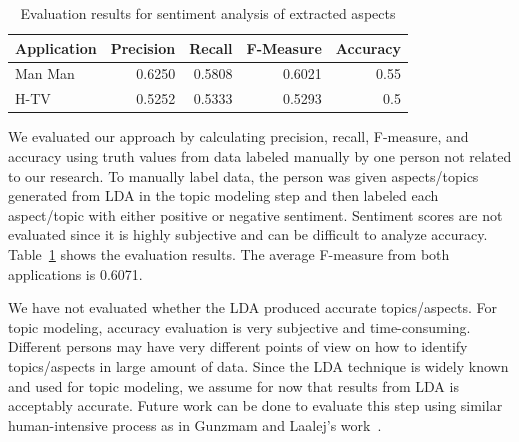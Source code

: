 \begin{table}[!htbp]
	\caption{Evaluation results for sentiment analysis of extracted aspects}
	\label{table:f-measureTopic}
	\centering
	\begin{tabular}{|l|r|r|r|r|}
		\hline
		\multicolumn{1}{|c|}{\textbf{Application}} & 
		\multicolumn{1}{|c|}{\textbf{Precision}} &
		\multicolumn{1}{|c|}{\textbf{Recall}} &
		\multicolumn{1}{|c|}{\textbf{F-Measure}} &
		\multicolumn{1}{|c|}{\textbf{Accuracy}} \\
		\hline
		Man Man & 
		0.6250
		& 
		0.5808
		& 
		0.6021
		& 
		0.55
		\\
		\hline
		H-TV & 0.5252 & 0.5333 & 0.5293 & 0.5\\
		\hline
	\end{tabular}
\end{table}


We evaluated our approach by calculating precision, recall, F-measure, and accuracy using truth values from data labeled manually by one person not related to our research. To manually label data, the person was given aspects/topics generated from LDA in the topic modeling step and then labeled each aspect/topic with either positive or negative sentiment. Sentiment scores are not evaluated since it is highly subjective and can be difficult to analyze accuracy. Table~\ref{table:f-measureTopic} shows the evaluation results. The average F-measure from both applications is 0.6071. 

We have not evaluated whether the LDA produced accurate topics/aspects. For topic modeling, accuracy evaluation is very subjective and time-consuming. Different persons may have very different points of view on how to identify topics/aspects in large amount of data.  Since the LDA technique is widely known and used for topic modeling, we assume for now that results from LDA is acceptably accurate. Future work can be done to evaluate this step using similar human-intensive process as in Gunzmam and Laalej's work~\cite{userslikefeature}.

